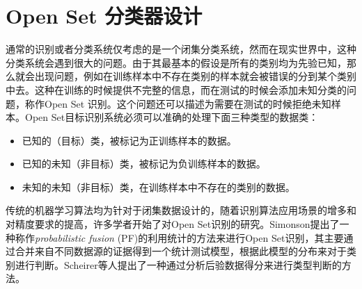 \section{Open Set 分类器设计}
通常的识别或者分类系统仅考虑的是一个闭集分类系统，然而在现实世界中，这种分类系统会遇到很大的问题。由于其最基本的假设是所有的类别均为先验已知，那么就会出现问题，例如在训练样本中不存在类别的样本就会被错误的分到某个类别中去。这种在训练的时候提供不完整的信息，而在测试的时候会添加未知分类的问题，称作Open Set 识别\cite{scheirer2013toward, jain2014multi}。这个问题还可以描述为需要在测试的时候拒绝未知样本。Open Set目标识别系统必须可以准确的处理下面三种类型的数据类：
\begin{itemize}
	\item 已知的（目标）类，被标记为正训练样本的数据。
	\item 已知的未知（非目标）类，被标记为负训练样本的数据。
	\item 未知的未知（非目标）类，在训练样本中不存在的类别的数据。
\end{itemize}
传统的机器学习算法均为针对于闭集数据设计的，随着识别算法应用场景的增多和对精度要求的提高，许多学者开始了对Open Set识别的研究。Simonson\cite{simonson1998probabilistic}提出了一种称作\textit{probabilistic fusion} (PF)的利用统计的方法来进行Open Set识别，其主要通过合并来自不同数据源的证据得到一个统计测试模型，根据此模型的分布来对于类别进行判断。Scheirer等人\cite{scheirer2011meta}提出了一种通过分析后验数据得分来进行类型判断的方法。

